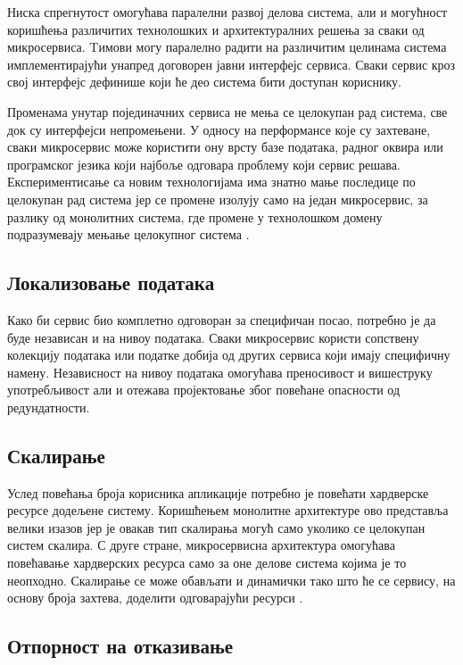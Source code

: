 \documentclass[12pt,oneside]{memoir}
\begin{document}
Ниска спрегнутост омогућава паралелни развој делова система, али и могућност коришћења различитих технолошких и архитектуралних решења за сваки од микросервиса. Tимови могу паралелно радити на различитим целинама система имплементирајући унапред договорен јавни интерфејс сервиса. Сваки сервис кроз свој интерфејс дефинише који ће део система бити доступан кориснику.

Променама унутар појединачних сервиса не мења се целокупан рад система, све док су интерфејси непромењени. У односу на перформансе које су захтеване, сваки микросервис може користити ону врсту базе података, радног оквира или програмског језика који најбоље одговара проблему који сервис решава. Експериментисање са новим технологијама има знатно мање последице по целокупан рад система јер се промене изолују само на један микросервис, за разлику од монолитних система, где промене у технолошком домену подразумевају мењање целокупног система \cite{microservicesBook}.


\subsection{Локализовање података}

Како би сервис био комплетно одговоран за специфичан посао, потребно је да буде независан и на нивоу података. Сваки микросервис користи сопствену колекцију података или податке добија од других сервиса који имају специфичну намену. Независност на нивоу података омогућава преносивост и вишеструку употребљивост али и отежава пројектовање због повећане опасности од редундатности.


\subsection{Скалирање}

Услед повећања броја корисника апликације потребно је повећати хардверске ресурсе додељене систему. Коришћењем монолитне архитектуре ово представља велики изазов јер је овакав тип скалирања могућ само уколико се целокупан систем скалира. С друге стране, микросервисна архитектура омогућава повећавање хардверских ресурса само за оне делове система којима је то неопходно. Скалирање се може обављати и динамички тако што ће се сервису, на основу броја захтева, доделити одговарајући ресурси \cite{microservicesBook}.


\subsection{Отпорност на отказивање}
\end{document}
